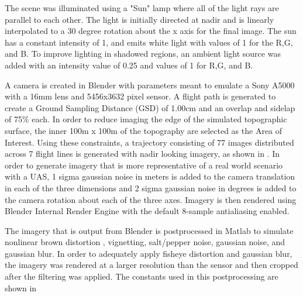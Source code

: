 The scene was illuminated using a "Sun" lamp where all of the light rays are parallel to each other.  The light is initially directed at nadir and is linearly interpolated to a 30 degree rotation about the x axis for the final image. The sun has a constant intensity of 1, and emits white light with values of 1 for the R,G, and B.  To improve lighting in shadowed regions, an ambient light source was added with an intensity value of 0.25 and values of 1 for R,G, and B.  



A camera is created in Blender with parameters meant to emulate a Sony A5000 with a 16mm lens and 5456x3632 pixel sensor.  A flight path is generated to create a Ground Sampling Distance (GSD) of 1.00cm and an overlap and sidelap of 75\% each.  In order to reduce imaging the edge of the simulated topographic surface, the inner 100m x 100m of the topography are selected as the Area of Interest.  Using these constraints, a trajectory consisting of 77 images distributed across 7 flight lines is generated with nadir looking imagery, as shown in .  In order to generate imagery that is more representative of a real world scenario with a UAS, 1 sigma gaussian noise in meters is added to the camera translation in each of the three dimensions and 2 sigma gaussian noise in degrees is added to the camera rotation about each of the three axes.  Imagery is then rendered using Blender Internal Render Engine with the default 8-sample antialiasing enabled.  



The imagery that is output from Blender is postprocessed in Matlab to simulate nonlinear brown distortion , vignetting, salt/pepper noise, gaussian noise, and gaussian blur.  In order to adequately apply fisheye distortion and gaussian blur, the imagery was rendered at a larger resolution than the sensor and then cropped after the filtering was applied.  The constants used in this postprocessing are shown in   



